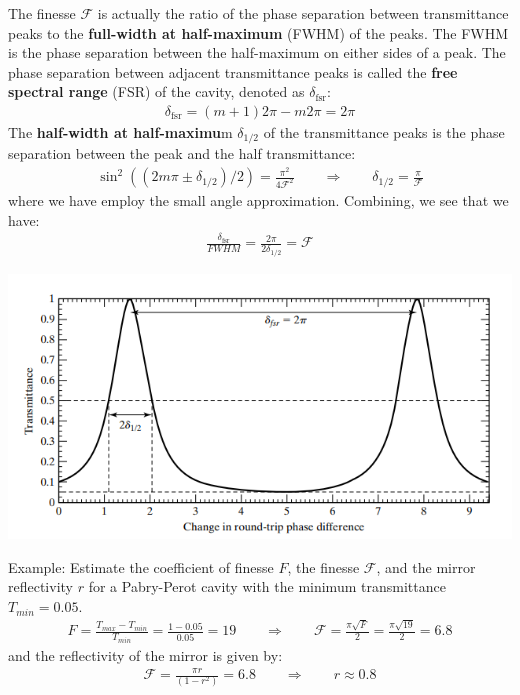 \documentclass[11pt]{book}
\theoremstyle{break}
\theoremstyle{break}
\newcommand{\example}{\color{green}Example: \color{black}}
\begin{document}
The finesse $\mathcal{F}$ is actually the ratio of the phase separation between transmittance peaks to the \textbf{full-width at half-maximum} (FWHM) of the peaks. The FWHM is the phase separation between the half-maximum on either sides of a peak. The phase separation between adjacent transmittance peaks is called the \textbf{free spectral range} (FSR) of the cavity, denoted as $\delta_{\text{fsr}}$:
\begin{align*}
\delta_{\text{fsr}} = (m+1) 2\pi -m2\pi = 2\pi
\end{align*}
The \textbf{half-width at half-maximu}m $\delta_{1/2}$ of the transmittance peaks is the phase separation between the peak and the half transmittance:
\begin{align*}
\sin^2((2m \pi \pm \delta_{1/2})/2) = \frac{\pi^2}{4\mathcal{F}^2} \qquad \Rightarrow \qquad \delta_{1/2} = \frac{\pi}{\mathcal{F}}
\end{align*}
where we have employ the small angle approximation. Combining, we see that we have:
\begin{align*}
\frac{\delta_{\text{fsr}}}{FWHM} = \frac{2\pi}{2\delta_{1/2}} = \mathcal{F}
\end{align*}
\begin{center}
\includegraphics[scale=0.95]{fsr1.png}
\end{center}
\example Estimate the coefficient of finesse $F$, the finesse $\mathcal{F}$, and the mirror reflectivity $r$ for a Pabry-Perot cavity with the minimum transmittance $T_{min} = 0.05$.
\begin{align*}
F = \frac{T_{max} - T_{min}}{T_{min}} = \frac{1-0.05}{0.05} = 19\qquad \Rightarrow\qquad 
\mathcal{F} = \frac{\pi \sqrt{F}}{2} = \frac{\pi \sqrt{19}}{2} = 6.8
\end{align*}
and the reflectivity of the mirror is given by:
\begin{align*} 
\mathcal{F} = \frac{\pi r}{(1-r^2)} = 6.8 \qquad \Rightarrow \qquad r \approx 0.8
\end{align*}
\end{document}
